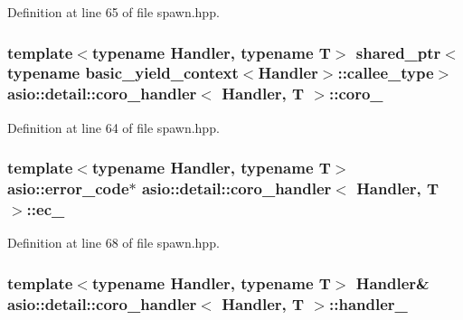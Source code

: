 Definition at line 65 of file spawn.\+hpp.

\hypertarget{classasio_1_1detail_1_1coro__handler_ade2c5b3ffa7a8133cf377722ae9927ba}{}
\subsubsection[{coro\+\_\+}]{\setlength{\rightskip}{0pt plus 5cm}template$<$typename Handler, typename T$>$ shared\+\_\+ptr$<$typename {\bf basic\+\_\+yield\+\_\+context}$<$Handler$>$\+::callee\+\_\+type$>$ {\bf asio\+::detail\+::coro\+\_\+handler}$<$ Handler, T $>$\+::coro\+\_\+}\label{classasio_1_1detail_1_1coro__handler_ade2c5b3ffa7a8133cf377722ae9927ba}


Definition at line 64 of file spawn.\+hpp.

\hypertarget{classasio_1_1detail_1_1coro__handler_a3ccc5748759a0aab189fbb1c7b9ef54c}{}
\subsubsection[{ec\+\_\+}]{\setlength{\rightskip}{0pt plus 5cm}template$<$typename Handler, typename T$>$ {\bf asio\+::error\+\_\+code}$\ast$ {\bf asio\+::detail\+::coro\+\_\+handler}$<$ Handler, T $>$\+::ec\+\_\+}\label{classasio_1_1detail_1_1coro__handler_a3ccc5748759a0aab189fbb1c7b9ef54c}


Definition at line 68 of file spawn.\+hpp.

\hypertarget{classasio_1_1detail_1_1coro__handler_a093789199f45e6730fff1953320988d6}{}
\subsubsection[{handler\+\_\+}]{\setlength{\rightskip}{0pt plus 5cm}template$<$typename Handler, typename T$>$ Handler\& {\bf asio\+::detail\+::coro\+\_\+handler}$<$ Handler, T $>$\+::handler\+\_\+}\label{classasio_1_1detail_1_1coro__handler_a093789199f45e6730fff1953320988d6}


